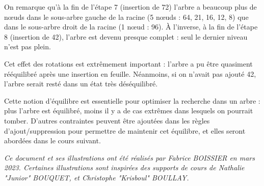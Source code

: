 \documentclass[11pt,a4paper]{article}
\begin{document}
\bigskip

On remarque qu'à la fin de l'étape 7 (insertion de 72) l'arbre a beaucoup plus de nœuds dans le sous-arbre gauche de la racine (5 nœuds : 64, 21, 16, 12, 8) que dans le sous-arbre droit de la racine (1 nœud : 96).
À l'inverse, à la fin de l'étape 8 (insertion de 42), l'arbre est devenu presque complet : seul le dernier niveau n'est pas plein.

\smallskip

Cet effet des rotations est extrêmement important : l'arbre a pu être quasiment rééquilibré après une insertion en feuille.
Néanmoins, si on n'avait pas ajouté 42, l'arbre serait resté dans un état très déséquilibré.

\medskip

Cette notion d'équilibre est essentielle pour optimiser la recherche dans un arbre : plus l'arbre est équilibré, moins il y a de cas extrêmes dans lesquels on pourrait tomber.
D'autres contraintes peuvent être ajoutées dans les règles d'ajout/suppression pour permettre de maintenir cet équilibre, et elles seront abordées dans le cours suivant.



\bigskip

\vfillFirst

\vfillLast


\begin{center}
\textit{Ce document et ses illustrations ont été réalisés par Fabrice BOISSIER en mars 2023.
Certaines illustrations sont inspirées des supports de cours de Nathalie "Junior" BOUQUET, et Christophe "Krisboul" BOULLAY.}
\end{center}
\end{document}
